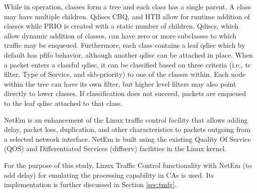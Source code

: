 While in operation, classes form a tree and each class has a single parent. A class may have multiple children. Qdiscs CBQ, and HTB allow for runtime addition of classes while PRIO is created with a static number of children. Qdiscs, which allow dynamic addition of classes, can have zero or more subclasses to which traffic may be enqueued. Furthermore, each class contains a leaf qdisc which by default has pfifo behavior, although another qdisc can be attached in place. When a packet enters a classful qdisc, it can be classified based on three criteria (i.e., tc filter, Type of Service, and skb-priority) to one of the classes within. Each node within the tree can have its own filter, but higher level filters may also point directly to lower classes. If classification does not succeed, packets are enqueued to the leaf qdisc attached to that class.

NetEm is an enhancement of the Linux traffic control facility that allows adding delay, packet loss, duplication, and other characteristics to packets outgoing from a selected network interface. NetEm is built using the existing Quality Of Service (QOS) and Differentiated Services (diffserv) facilities in the Linux kernel.

For the purpose of this study, Linux Traffic Control functionality with NetEm (to add delay) for emulating the processing capability in CAs is used. Its implementation is further discussed in Section \ref{sec:tmfg}. 